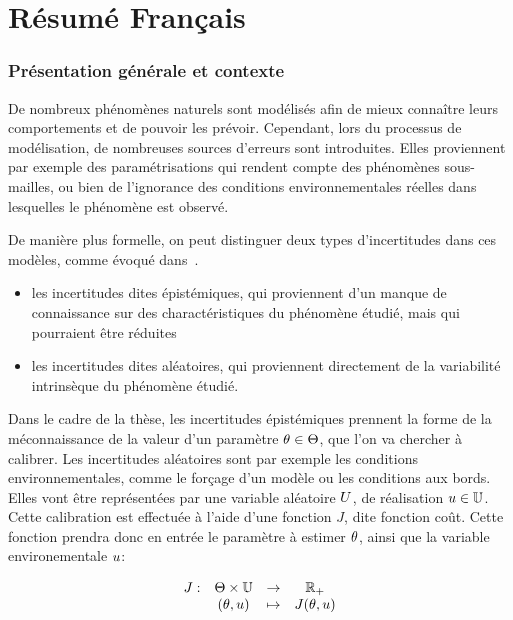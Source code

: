\documentclass[../../Main_ManuscritThese.tex]{subfiles}
\begin{document}
\chapter*{Résumé Français}
\TitleBtwLines

{}
\label{chap:resume_fr}
\pagestyle{contentStyle}

\subsection*{Présentation générale et contexte}
De nombreux phénomènes naturels sont modélisés afin de mieux connaître leurs comportements et de pouvoir les prévoir.
Cependant, lors du processus de modélisation, de nombreuses sources d'erreurs sont introduites. Elles proviennent par exemple des paramétrisations qui rendent compte des phénomènes sous-mailles, ou bien de l'ignorance des conditions environnementales réelles dans lesquelles le phénomène est observé.

De manière plus formelle, on peut distinguer deux types d'incertitudes dans ces modèles, comme évoqué dans~\cite{walker_defining_2003}.
\begin{itemize}
\item les incertitudes dites épistémiques, qui proviennent d'un manque de connaissance sur des charactéristiques du phénomène étudié, mais qui pourraient être réduites 
\item les incertitudes dites aléatoires, qui proviennent directement de la variabilité intrinsèque du phénomène étudié.
\end{itemize}

Dans le cadre de la thèse, les incertitudes épistémiques prennent la forme de la méconnaissance de la valeur d'un paramètre $\theta \in \Theta$, que l'on va chercher à calibrer. Les incertitudes aléatoires sont par exemple les conditions environnementales, comme le forçage d'un modèle ou les conditions aux bords. Elles vont être représentées par une variable aléatoire $U$, de réalisation $u\in \mathbb{U}$.
Cette calibration est effectuée à l'aide d'une fonction $J$, dite fonction coût. Cette fonction prendra donc en entrée le paramètre à estimer $\theta$, ainsi que la variable environementale $u$:

\begin{equation}
  \label{eq:def_J}
  \begin{array}{rccc}
   J: & \Theta\times\mathbb{U}& \rightarrow& \mathbb{R}_+ \\
   &(\theta,u)& \mapsto& J(\theta,u)
  \end{array}
\end{equation}
\end{document}
